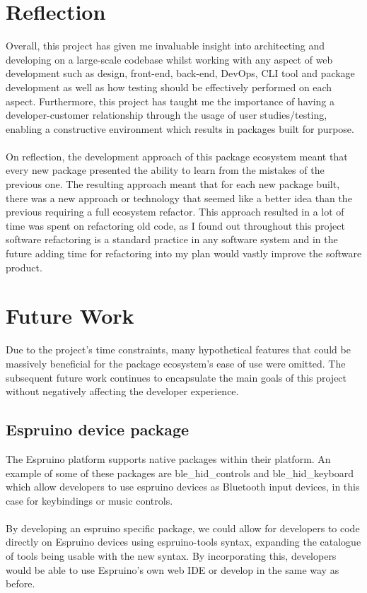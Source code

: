 \documentclass{l4proj}
\begin{document}
\section{Reflection}

Overall, this project has given me invaluable insight into architecting and developing on a large-scale codebase whilst working with any aspect of web development such as design, front-end, back-end, DevOps, CLI tool and package development as well as how testing should be effectively performed on each aspect. Furthermore, this project has taught me the importance of having a developer-customer relationship through the usage of user studies/testing, enabling a constructive environment which results in packages built for purpose.
\\ \\
On reflection, the development approach of this package ecosystem meant that every new package presented the ability to learn from the mistakes of the previous one. The resulting approach meant that for each new package built, there was a new approach or technology that seemed like a better idea than the previous requiring a full ecosystem refactor. This approach resulted in a lot of time was spent on refactoring old code, as I found out throughout this project software refactoring is a standard practice in any software system and in the future adding time for refactoring into my plan would vastly improve the software product.

\section{Future Work}
Due to the project's time constraints, many hypothetical features that could be massively beneficial for the package ecosystem's ease of use were omitted. The subsequent future work continues to encapsulate the main goals of this project without negatively affecting the developer experience.
\subsection{Espruino device package}

The Espruino platform supports native packages within their platform. An example of some of these packages are ble\_hid\_controls and ble\_hid\_keyboard which allow developers to use espruino devices as Bluetooth input devices, in this case for keybindings or music controls.
\\ \\
By developing an espruino specific package, we could allow for developers to code directly on Espruino devices using espruino-tools syntax, expanding the catalogue of tools being usable with the new syntax. By incorporating this, developers would be able to use Espruino's own web IDE or develop in the same way as before.
\end{document}
